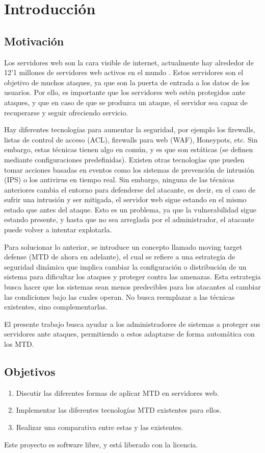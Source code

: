 \chapter{Introducción}

\section{Motivación}
Los servidores web son la cara visible de internet, actualmente hay alrededor de 12'1 millones de servidores web activos en el mundo \cite{netcraft-agosto23}. Estos servidores son el objetivo de muchos ataques, ya que son la puerta de entrada a los datos de los usuarios.\cite{breaches-2023} Por ello, es importante que los servidores web estén protegidos ante ataques, y que en caso de que se produzca un ataque, el servidor sea capaz de recuperarse y seguir ofreciendo servicio.

Hay diferentes tecnologías para aumentar la seguridad, por ejemplo los firewalls, listas de control de acceso (ACL), firewalls para web (WAF), Honeypots, etc. Sin embargo, estas técnicas tienen algo en común, y es que son estáticas (se definen mediante configuraciones predefinidas). Existen otras tecnologías que pueden tomar acciones basadas en eventos como los sistemas de prevención de intrusión (IPS) o los antivirus en tiempo real. Sin embargo, ninguna de las técnicas anteriores cambia el entorno para defenderse del atacante, es decir, en el caso de sufrir una intrusión y ser mitigada, el servidor web sigue estando en el mismo estado que antes del ataque. Esto es un problema, ya que la vulnerabilidad sigue estando presente, y hasta que no sea arreglada por el administrador, el atacante puede volver a intentar explotarla.

Para solucionar lo anterior, se introduce un concepto llamado moving target defense (MTD de ahora en adelante), el cual se refiere a una estrategia de seguridad dinámica que implica cambiar la configuración o distribución de un sistema para dificultar los ataques y proteger contra las amenazas. Esta estrategia busca hacer que los sistemas sean menos predecibles para los atacantes al cambiar las condiciones bajo las cuales operan. No busca reemplazar a las técnicas existentes, sino complementarlas.

El presente trabajo busca ayudar a los administradores de sistemas a proteger sus servidores ante ataques, permitiendo a estos adaptarse de forma automática con los MTD.

\section{Objetivos}

\begin{enumerate}
    \item Discutir las diferentes formas de aplicar MTD en servidores web.
    \item Implementar las diferentes tecnologías MTD existentes para ellos.
    \item Realizar una comparativa entre estas y las existentes.
\end{enumerate}

Este proyecto es software libre, y está liberado con la licencia\cite{gplv3}.